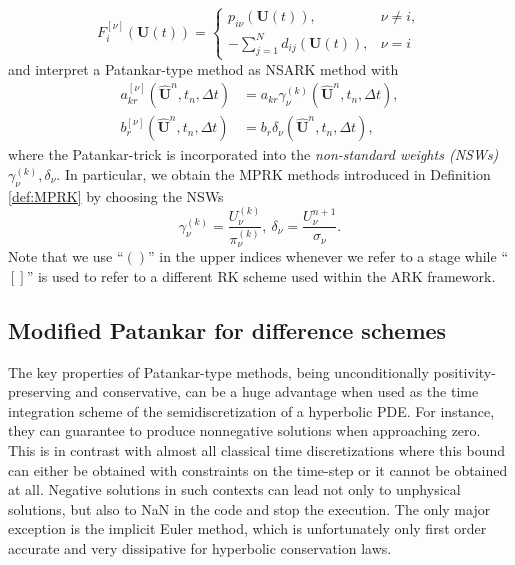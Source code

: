 \documentclass[final,11pt, times, linenumber, nopreprintline]{elsarticle}
\newcommand{\DT}[1]{{\color{purple}#1}}
\newcommand{\bU}{\bm U}
\begin{document}
\[F^{[\nu]}_i(\bU(t))=\begin{cases}p_{i\nu}(\bU(t)), &\nu\neq i,\\-\sum_{j=1}^Nd_{ij}(\bU(t)), &\nu=i \end{cases}\]
and interpret a Patankar-type method as NSARK method with 
\begin{equation}\label{eq:NSW}
    \begin{aligned}
        a_{kr}^{[\nu]}(\hat{\bU}^n,t_n,\Delta t)&=a_{kr}\gamma_{\nu}^{(k)}(\hat{\bU}^n,t_n,\Delta t),\\
        b_{r}^{[\nu]}(\hat{\bU}^n,t_n,\Delta t)&=b_{r}\delta_{\nu}(\hat{\bU}^n,t_n,\Delta t),
    \end{aligned}
\end{equation} 
where the Patankar-trick is incorporated into the \textit{non-standard weights (NSWs)} $\gamma_{\nu}^{(k)}, \delta_\nu$.
In particular, we obtain the MPRK methods introduced in Definition \ref{def:MPRK} by choosing the NSWs
\[\gamma_{\nu}^{(k)}=\frac{U_\nu^{(k)}}{\pi_\nu^{(k)}}, \  \delta_{\nu}=\frac{U_\nu^{n+1}}{\sigma_\nu}.\]
Note that we use \enquote{$()$} in the upper indices whenever we refer to a stage while \enquote{$[]$} is used to refer to a different RK scheme used within the ARK framework.

\subsection{Modified Patankar for difference schemes}


The key properties of Patankar-type methods, being unconditionally positivity-preserving and conservative, can be a huge advantage when used as the time integration scheme of the semidiscretization of a hyperbolic PDE. 
For instance, they can guarantee to produce nonnegative solutions when approaching zero. 
This is in contrast with almost all classical time discretizations where this bound can either be obtained with constraints on the time-step or it cannot be obtained at all. 
Negative solutions in such contexts can lead not only to unphysical solutions, but also to NaN in the code and stop the execution.
The only major exception is the implicit Euler method, which is unfortunately only first order accurate and very dissipative for hyperbolic conservation laws.
\end{document}
